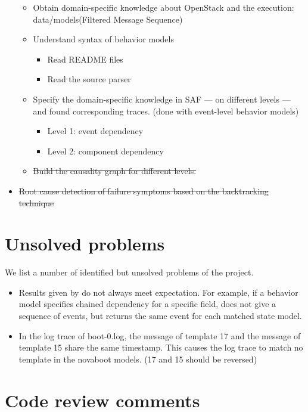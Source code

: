 \documentclass{article}
\begin{document}
\begin{itemize}
\begin{itemize}
  \item Obtain domain-specific knowledge about OpenStack and the execution:
    data/models(Filtered Message Sequence)
  \item Understand syntax of \saf{} behavior models
    \begin{itemize}
    \item Read README files
    \item Read the source parser
    \end{itemize}
  \item Specify the domain-specific knowledge in SAF --- on different levels ---
    and found corresponding traces. (done with event-level behavior models)
    \begin{itemize}
    \item Level 1: event dependency
    \item Level 2: component dependency
    \end{itemize}
  \item \sout{Build the causality graph for different levels.}
  \end{itemize}
\item \sout{Root cause detection of failure symptoms based on the backtracking technique}
\end{itemize}

\section{Unsolved problems}
\label{sec:usp}

We list a number of identified but unsolved problems of the project.

\begin{itemize}
\item Results given by \saf{} do not always meet expectation. For example, if a
behavior model specifies chained dependency for a specific field, \saf{} does
not give a sequence of events, but returns the same event for each matched state
model.

\item In the log trace of boot-0.log, the message of template 17 and the message
  of template 15 share the same timestamp. This causes the log trace to match no
  template in the novaboot models. (17 and 15 should be reversed)

\end{itemize}

\section{Code review comments}
\label{sec:codereview}
\end{document}
